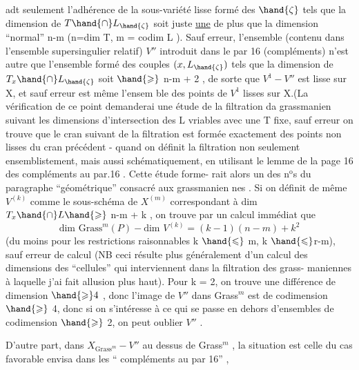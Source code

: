 
adt seulement l'adhérence de la sous-variété lisse formé des $\hand{\zeta}$ tels que
la dimension de $T\hand{\cap}L_{\hand{\zeta}}$ soit juste \uline{une} de plus que la dimension
``normal'' n-m (n=dim T, m = codim L ). Sauf erreur, l'ensemble
(contenu dans l'ensemble supersingulier relatif) $V''$ introduit dans le par
16 (compléments) n'est autre que l'ensemble formé des couples
$(x,L_{\hand{\zeta}})$ tels que la dimension de $T_x\hand{\cap}L_{\hand{\zeta}}$ soit $\hand{\geqslant}$ n-m + 2\hand{)} , de sorte que
 $V^1 - V''$ est  lisse sur X, et sauf erreur est même  l'ensem
ble des points de $V^1$ lisses sur X.(La vérification de ce point demanderai
une étude de la filtration da   grassmanien suivant les 
dimensions d'intersection des L vriables avec une T fixe, sauf erreur on
trouve que le cran suivant de la filtration est formée exactement des
points non lisses du cran précédent - quand on définit la filtration
\margin{$|$} non seulement ensemblistement, mais aussi schématiquement, en utilisant
le lemme de la page 16 des compléments au par.16 \hand{\unsure{)|\S}}. Cette étude forme-%
rait alors un des n$^{\text{o}}$s du paragraphe ``géométrique'' consacré aux grassmanien
nes \hand{)}. Si on définit de même  $V^{(k)}$ comme le sous-schéma de $X^{(m)}$
correspondant à dim $T_x\hand{\cap}L \hand{\geqslant}$ n-m + k , on trouve par un calcul immédiat
que 
\[ \text{dim Grass}^m(P) - \text{dim } V^{(k)} = (k-1)(n-m) + k^2 \]
(du moins pour les restrictions raisonnables k $\hand{\leqslant}$ m, k $\hand{\leqslant}$r-m), sauf
erreur de calcul (NB ceci résulte plus généralement d'un calcul des
dimensions des ``cellules'' qui interviennent dans la filtration des grass-%
maniennes à laquelle j'ai fait allusion plus haut). Pour k = 2, on
trouve une différence de dimension $\hand{\geqslant} 4$ , donc l'image de $V''$ dans Grass$^m$
est de codimension $\hand{\geqslant}$ 4, donc si on s'intéresse à ce qui se passe en dehors
d'ensembles  de codimension $\hand{\geqslant}$ 2, on peut  oublier $V''$ .

D'autre part, dans $X_{\text{Grass}^m} - V''$ au dessus de Grass$^m$ , la situation
est celle du cas favorable envisa dans les `` compléments au par 16'' ,

